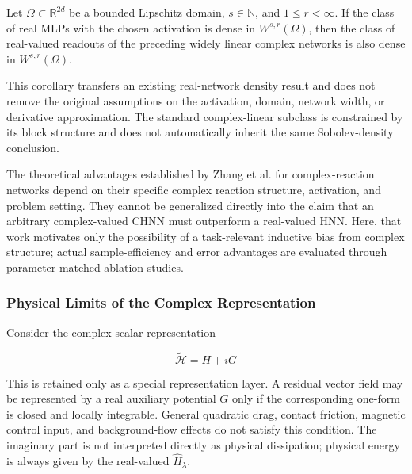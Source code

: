 \begin{corollary}\label{cor:sobolev-inheritance}
Let \(\Omega\subset\mathbb{R}^{2d}\) be a bounded Lipschitz domain, \(s\in\mathbb{N}\), and \(1 \leq r < \infty\). If the class of real MLPs with the chosen activation is dense in \(W^{s,r}(\Omega)\), then the class of real-valued readouts of the preceding widely linear complex networks is also dense in \(W^{s,r}(\Omega)\).
\end{corollary}

This corollary transfers an existing real-network density result and does not remove the original assumptions on the activation, domain, network width, or derivative approximation.\cite{Hornik1990DerivativeApproximation} The standard complex-linear subclass is constrained by its block structure and does not automatically inherit the same Sobolev-density conclusion.

The theoretical advantages established by Zhang et al. for complex-reaction networks depend on their specific complex reaction structure, activation, and problem setting.\cite{Zhang2022ComplexReaction} They cannot be generalized directly into the claim that an arbitrary complex-valued CHNN must outperform a real-valued HNN. Here, that work motivates only the possibility of a task-relevant inductive bias from complex structure; actual sample-efficiency and error advantages are evaluated through parameter-matched ablation studies.

\subsubsection{Physical Limits of the Complex Representation}\label{sec:chnn-4-2-5}

Consider the complex scalar representation

\begin{equation}
\label{eq:chnn-4-16}
\widetilde{\mathcal{H}} = H + iG
\end{equation}

This is retained only as a special representation layer. A residual vector field may be represented by a real auxiliary potential \(G\) only if the corresponding one-form is closed and locally integrable. General quadratic drag, contact friction, magnetic control input, and background-flow effects do not satisfy this condition. The imaginary part is not interpreted directly as physical dissipation; physical energy is always given by the real-valued \({\widehat{H}}_{\lambda}\).

